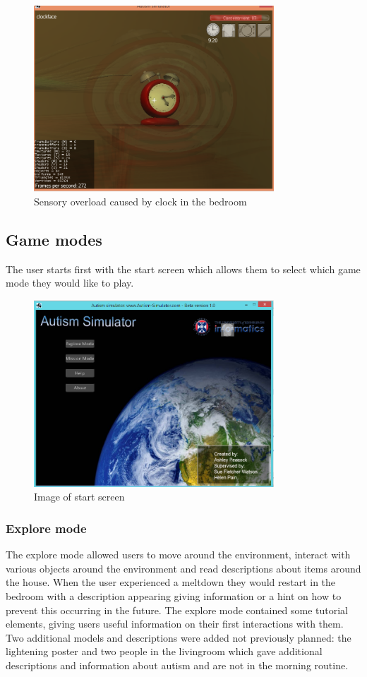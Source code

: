 \documentclass[11pt]{report}
\begin{document}
\begin{figure}[H]
\centering
\includegraphics[width=90mm]{images/implementationfirst/gameimages/overloadclock.png}
\caption{Sensory overload caused by clock in the bedroom}
\label{old_house}
\end{figure}

\subsection{Game modes}
The user starts first with the start screen which allows them to select which game mode they would like to play.
\begin{figure}[H]
\centering
\includegraphics[width=90mm]{images/implementationfirst/gameimages/startscreen.png}
\caption{Image of start screen}
\label{old_house}
\end{figure}


\subsubsection{Explore mode}
The explore mode allowed users to move around the environment, interact with various objects around the environment and read descriptions about items around the house. When the user experienced a meltdown they would restart in the bedroom with a description appearing giving information or a hint on how to prevent this occurring in the future. The explore mode contained some tutorial elements, giving users useful information on their first interactions with them. Two additional models and descriptions were added not previously planned: the lightening poster and two people in the livingroom which gave additional descriptions and information about autism and are not in the morning routine. 
\end{document}
